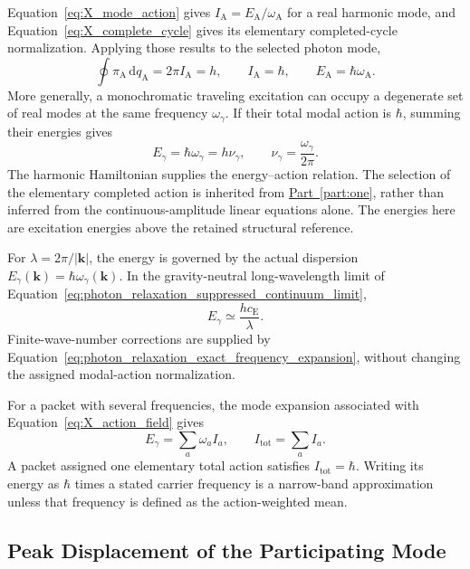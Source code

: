 Equation~\eqref{eq:X_mode_action} gives $I_{\mathrm A}=E_{\mathrm A}/\omega_{\mathrm A}$ for a real harmonic mode, and Equation~\eqref{eq:X_complete_cycle} gives its elementary completed-cycle normalization. Applying those results to the selected photon mode,
\begin{equation}
    \oint\pi_{\mathrm A}\,\mathrm dq_{\mathrm A}
    =2\pi I_{\mathrm A}=h,
    \qquad
    I_{\mathrm A}=\hbar,
    \qquad
    E_{\mathrm A}=\hbar\omega_{\mathrm A}.
\end{equation}
More generally, a monochromatic traveling excitation can occupy a degenerate set of real modes at the same frequency $\omega_\gamma$. If their total modal action is $\hbar$, summing their energies gives
\begin{equation}
    \boxed{
    E_\gamma=\hbar\omega_\gamma=h\nu_\gamma,
    \qquad \nu_\gamma=\frac{\omega_\gamma}{2\pi}
    }.
\end{equation}
The harmonic Hamiltonian supplies the energy--action relation. The selection of the elementary completed action is inherited from \hyperref[part:one]{Part~\ref*{part:one}}, rather than inferred from the continuous-amplitude linear equations alone. The energies here are excitation energies above the retained structural reference.

For $\lambda=2\pi/|\mathbf k|$, the energy is governed by the actual dispersion $E_\gamma(\mathbf k)=\hbar\omega_\gamma(\mathbf k)$. In the gravity-neutral long-wavelength limit of Equation~\eqref{eq:photon_relaxation_suppressed_continuum_limit},
\begin{equation}
    \boxed{E_\gamma\simeq\frac{hc_{\mathrm E}}{\lambda}}.
\end{equation}
Finite-wave-number corrections are supplied by Equation~\eqref{eq:photon_relaxation_exact_frequency_expansion}, without changing the assigned modal-action normalization.

For a packet with several frequencies, the mode expansion associated with Equation~\eqref{eq:X_action_field} gives
\begin{equation}
    E_\gamma=\sum_a\omega_a I_a,
    \qquad
    I_{\mathrm{tot}}=\sum_a I_a.
\end{equation}
A packet assigned one elementary total action satisfies $I_{\mathrm{tot}}=\hbar$. Writing its energy as $\hbar$ times a stated carrier frequency is a narrow-band approximation unless that frequency is defined as the action-weighted mean.

\subsection{Peak Displacement of the Participating Mode}

